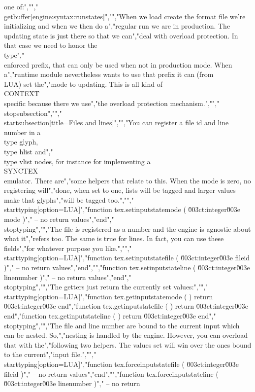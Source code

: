 one of:","","\\getbuffer[engine:syntax:runstates]","","When we load create the format file we're initializing and when we then do a","regular run we are in production. The updating state is just there so that we can","deal with overload protection. In that case we need to honor the \\type","{\\enforced} prefix, that can only be used when not in production mode. When a","runtime module nevertheless wants to use that prefix it can (from \\LUA) set the","mode to updating. This is all kind of \\CONTEXT\\ specific because there we use","the overload protection mechanism.","","\\stopsubsection","","\\startsubsection[title=Files and lines]","","You can register a file id and line number in a \\type {glyph}, \\type {hlist} and","\\type {vlist} nodes, for instance for implementing a \\SYNCTEX\\ emulator. There are","some helpers that relate to this. When the mode is zero, no registering will","done, when set to one, lists will be tagged and larger values make that glyphs","will be tagged too.","","\\starttyping[option=LUA]","function tex.setinputstatemode ( \u003ct:integer\u003e mode )","    -- no return values","end","\\stoptyping","","The file is registered as a number and the engine is agnostic about what it","refers too. The same is true for lines. In fact, you can use these fields","for whatever purpose you like.","","\\starttyping[option=LUA]","function tex.setinputstatefile ( \u003ct:integer\u003e fileid )","    -- no return values","end","","function tex.setinputstateline ( \u003ct:integer\u003e linenumber )","    -- no return values","end","\\stoptyping","","The getters just return the currently set values:","","\\starttyping[option=LUA]","function tex.getinputstatemode ( ) return \u003ct:integer\u003e end","function tex.getinputstatefile ( ) return \u003ct:integer\u003e end","function tex.getinputstateline ( ) return \u003ct:integer\u003e end","\\stoptyping","","The file and line number are bound to the current input which can be nested. So,","nesting is handled by the engine. However, you can overload that with the","following two helpers. The values set will win over the ones bound to the current","input file.","","\\starttyping[option=LUA]","function tex.forceinputstatefile ( \u003ct:integer\u003e fileid )","    -- no return values","end","","function tex.forceinputstateline ( \u003ct:integer\u003e linenumber )","    -- no return 